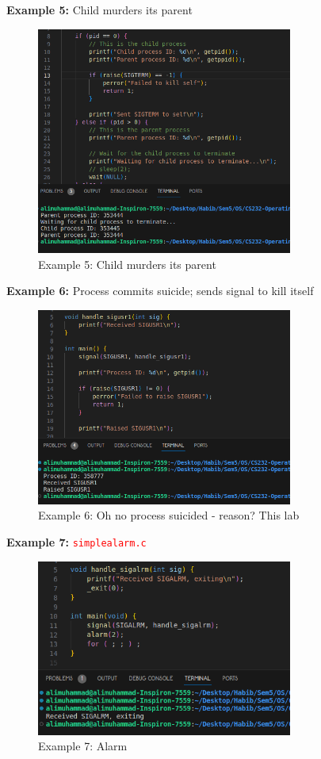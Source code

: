 \documentclass[addpoints]{exam}
\begin{document}
\begin{questions}
    \question
    \textbf{Example 5:} Child murders its parent
    \begin{figure}[H]
        \centering
        \includegraphics[width=0.75\textwidth]{eg5.png}
        \caption*{Example 5: Child murders its parent}
    \end{figure}
    
    \question
    \textbf{Example 6:} Process commits suicide; sends signal to kill itself
    \begin{figure}[H]
        \centering
        \includegraphics[width=0.75\textwidth]{eg6.png}
        \caption*{Example 6: Oh no process suicided - reason? This lab}
    \end{figure}
    
    \question
    \textbf{Example 7:} \texttt{\textcolor{red}{simplealarm.c}}
    \begin{figure}[H]
        \centering
        \includegraphics[width=0.75\textwidth]{eg7.png}
        \caption*{Example 7: Alarm}
    \end{figure}
    

\end{questions}
\end{document}
